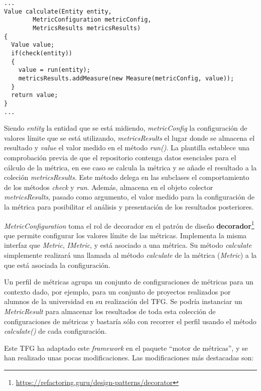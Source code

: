 \begin{minipage}{\linewidth}
\begin{verbatim}
...
Value calculate(Entity entity, 
		MetricConfiguration metricConfig, 
		MetricsResults metricsResults) 
{
  Value value;
  if(check(entity))
  {
    value = run(entity);
    metricsResults.addMeasure(new Measure(metricConfig, value));
  }
  return value;
}
...
\end{verbatim}
\end{minipage}

Siendo \textit{entity} la entidad que se está midiendo, \textit{metricConfig} la configuración de valores límite que se está utilizando, \textit{metricsResults} el lugar donde se almacena el resultado y \textit{value} el valor medido en el método \textit{run()}. La plantilla establece una comprobación previa de que el repositorio contenga datos esenciales para el cálculo de la métrica, en ese caso se calcula la métrica y se añade el resultado a la coleción \textit{metricsResults}. 
Este método delega en las subclases el comportamiento de los métodos \textit{check} y \textit{run}. Además, almacena en el objeto colector \textit{metricsResults}, pasado como argumento, el valor medido para la configuración de la métrica para posibilitar el análisis y presentación de los resultados posteriores.

\textit{MetricConfiguration} toma el rol de decorador en el patrón de diseño \textbf{decorador}\footnote{\url{https://refactoring.guru/design-patterns/decorator}} que permite configurar los valores límite de las métricas. Implementa la misma interfaz que \textit{Metric}, \textit{IMetric}, y está asociado a una métrica. Su método \textit{calculate} simplemente realizará una llamada al método \textit{calculate} de la métrica (\textit{Metric}) a la que está asociada la configuración.

Un perfil de métricas agrupa un conjunto de configuraciones de métricas para un contexto dado, por ejemplo, para un conjunto de proyectos realizados por alumnos de la universidad en su realización del TFG. Se podría instanciar un \textit{MetricResult} para almacenar los resultados de toda esta colección de configuraciones de métricas y bastaría sólo con recorrer el perfil usando el método \textit{calculate()} de cada configuración.

Este TFG ha adaptado este \textit{framework} en el paquete ``motor de métricas'', y se han realizado unas pocas modificaciones. Las modificaciones más destacadas son:

